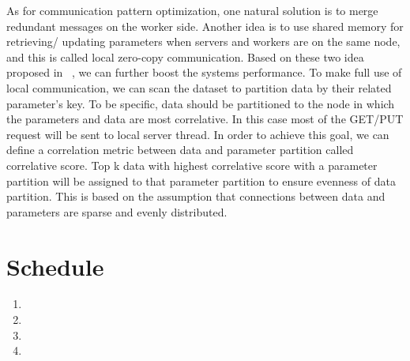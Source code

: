 \documentclass{article}
\begin{document}
\noindent As for communication pattern optimization, one natural solution is to merge redundant messages on the worker side. Another idea is to use shared memory for retrieving/ updating parameters when servers and workers are on the same node, and this is called local zero-copy communication. Based on these two idea proposed in ~\cite{huang2018flexps}, we can further boost the systems performance. To make full use of local communication, we can scan the dataset to partition data by their related parameter’s key. To be specific, data should be partitioned to the node in which the parameters and data are most correlative. In this case most of the GET/PUT request will be sent to local server thread. In order to achieve this goal, we can define a correlation metric between data and parameter partition called correlative score. Top k data with highest correlative score with a parameter partition will be assigned to that parameter partition to ensure evenness of data partition. This is based on the assumption that connections between data and parameters are sparse and evenly distributed.

\section{Schedule}

\begin{enumerate}
\item {}
\item {}
\item {}
\item {}
\end{enumerate}



\end{document}
